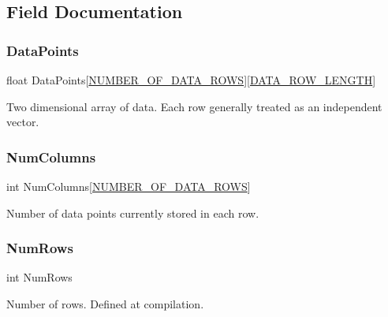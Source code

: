 \subsection{Field Documentation}
\mbox{\label{struct_data_a1984363a7b509590c1bae03601360a0e}} 
\subsubsection{\texorpdfstring{DataPoints}{DataPoints}}
{\footnotesize\ttfamily float Data\+Points\mbox{[}\mbox{\hyperlink{_s_p_i___instruction_set_8h_a030a0b94acdc35db8cf20a5044a1c775}{N\+U\+M\+B\+E\+R\+\_\+\+O\+F\+\_\+\+D\+A\+T\+A\+\_\+\+R\+O\+WS}}\mbox{]}\mbox{[}\mbox{\hyperlink{_s_p_i___instruction_set_8h_afaade7aab877c51eaea08012fa5a7ce2}{D\+A\+T\+A\+\_\+\+R\+O\+W\+\_\+\+L\+E\+N\+G\+TH}}\mbox{]}}



Two dimensional array of data. Each row generally treated as an independent vector. 

\mbox{\label{struct_data_ab7ad5d3d8f1e4b3f42c5aedb1e74b336}} 
\subsubsection{\texorpdfstring{NumColumns}{NumColumns}}
{\footnotesize\ttfamily int Num\+Columns\mbox{[}\mbox{\hyperlink{_s_p_i___instruction_set_8h_a030a0b94acdc35db8cf20a5044a1c775}{N\+U\+M\+B\+E\+R\+\_\+\+O\+F\+\_\+\+D\+A\+T\+A\+\_\+\+R\+O\+WS}}\mbox{]}}



Number of data points currently stored in each row. 

\mbox{\label{struct_data_ac0883de785701631da0e099578c748ca}} 
\subsubsection{\texorpdfstring{NumRows}{NumRows}}
{\footnotesize\ttfamily int Num\+Rows}



Number of rows. Defined at compilation. 

\mbox{\label{struct_data_a653f4e0cb59f5c3f36f5664be1f11c01}} 
